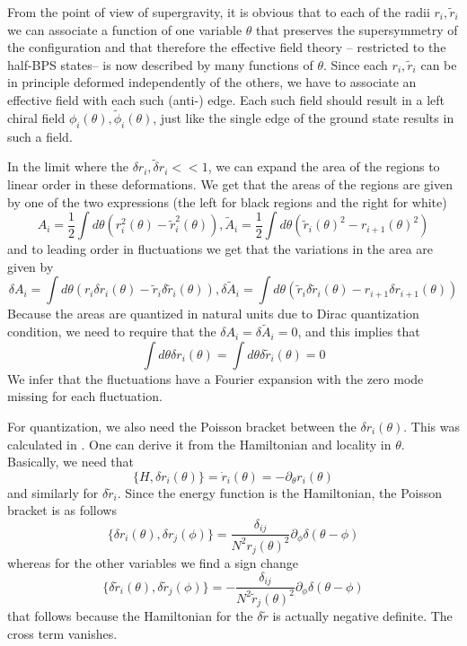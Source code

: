 \documentclass[12pt,nofootinbib, longbibliography]{revtex4-1}
\begin{document}
From the point of view of supergravity, it is obvious that to each of the  radii $r_i, \tilde r_i$ we can associate a function of one variable $\theta$ that preserves the supersymmetry of the configuration and that therefore the effective field theory -- restricted to the half-BPS states-- is now described by 
many functions of $\theta$. Since each $r_i, \tilde r_i$ can be in principle deformed independently of the others, we have to associate an effective field with each such (anti-) edge. Each such field should result 
in a left chiral field $\phi_i(\theta), \tilde \phi_i(\theta)$, just like the single edge of the ground state results in such a field. 

In the limit where the $\delta r_i, \tilde \delta r_i <<1$, we can expand the area of the regions to linear order in these deformations. We get that the areas of the regions are given by one of the two expressions (the left for black regions and the right for white)
\begin{equation}
A_i= \frac 12 \int d\theta(r_i^2(\theta)-\tilde r_i^2(\theta)), \tilde A_i =\frac 12 \int d \theta( \tilde r_i(\theta)^2-r_{i+1}(\theta)^2)
\end{equation}
and to leading order in fluctuations we get that the variations in the area are given by  
\begin{equation}
\delta A_i=  \int d\theta(r_i \delta r_i (\theta)-\tilde r_i \delta\tilde r_i (\theta)), \delta \tilde A_i = \int d \theta ( \tilde r_i \delta \tilde r_i(\theta)-r_{i+1}\delta r_{i+1}(\theta))
\end{equation}
 Because the areas are quantized in natural units due to Dirac quantization condition, we need to require that the $\delta A_i = \delta \tilde  A_i =0$, and this implies that 
 \begin{equation}
 \int d\theta \delta r_i(\theta)= \int d \theta \delta \tilde r_i(\theta)=0
 \end{equation}
We infer that the fluctuations have a Fourier expansion with the zero mode  missing for each fluctuation. 

For quantization, we also need the Poisson bracket between the $\delta r_i(\theta)$. This was calculated in \cite{Maoz:2005nk}. One can derive it from the Hamiltonian and locality in $\theta$. Basically, we need that
\begin{equation}
\{ H, \delta r_i(\theta)\} = \dot r_i(\theta) = -\partial_\theta r_i(\theta) 
\end{equation}
and similarly for $\delta \tilde r_i$.
Since the energy function is the Hamiltonian, the Poisson bracket is as follows
\begin{equation}
\{\delta r_i(\theta), \delta r_j(\phi)\} = \frac {\delta_{ij}}{N^2 r_j(\theta)^2} \partial_\phi \delta(\theta-\phi)
\end{equation}
whereas for the other variables we find a sign change
\begin{equation}
\{\delta \tilde r_i(\theta), \delta \tilde r_j(\phi)\} = - \frac {\delta_{ij}}{N^2 \tilde r_j(\theta)^2} \partial_\phi \delta(\theta-\phi)
\end{equation}
that follows because the Hamiltonian for the $\delta \tilde r$ is actually negative definite.  The cross term vanishes.
\end{document}
